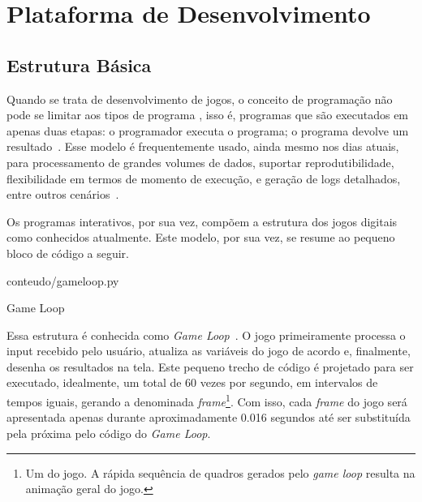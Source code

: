 
\chapter{Plataforma de Desenvolvimento}
\label{cap:plataforma de desenvolvimento}
\section{Estrutura Básica}

Quando se trata de desenvolvimento de jogos, o conceito de programação não pode se limitar aos tipos de programa \textquotedbl{}, isso é, programas que são executados em apenas duas etapas: o programador executa o programa; o programa devolve um resultado~\citep{IAEmTowerDefense}. Esse modelo é frequentemente usado, ainda mesmo nos dias atuais, para processamento de grandes volumes de dados, suportar reprodutibilidade, flexibilidade em termos de momento de execução, e geração de logs detalhados, entre outros cenários~\citep{BatchProgramming}.

Os programas interativos, por sua vez, compõem a estrutura dos jogos digitais como conhecidos atualmente. Este modelo, por sua vez, se resume ao pequeno bloco de código a seguir.

\begin{program}
    
    {conteudo/gameloop.py}
  
    \caption{Game Loop\label{prog:gameloop}}
\end{program}

Essa estrutura é conhecida como \textit{Game Loop}~\citep{GameProgramming}. O jogo primeiramente processa o input recebido pelo usuário, atualiza as variáveis do jogo de acordo e, finalmente, desenha os resultados na tela. Este pequeno trecho de código é projetado para ser executado, idealmente, um total de 60 vezes por segundo, em intervalos de tempos iguais, gerando a denominada \textit{frame}\footnote{
    Um \textquotedbl{} do jogo. A rápida sequência de quadros gerados pelo \textit{game loop} resulta na animação geral do jogo.
}. Com isso, cada \textit{frame} do jogo será apresentada apenas durante aproximadamente 0.016 segundos até ser substituída pela próxima pelo código do \textit{Game Loop}.


